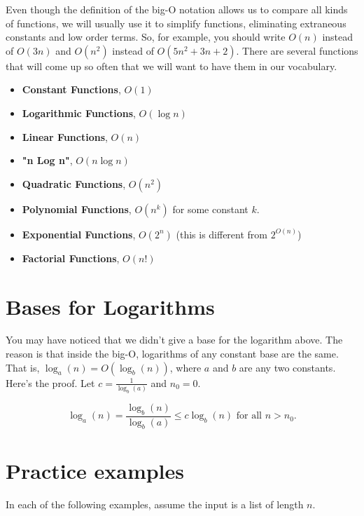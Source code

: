 Even though the definition of the big-O notation allows us to compare all kinds of functions, we will usually use it to simplify functions, eliminating extraneous constants and low order terms.
So, for example, you should write $O(n)$ instead of $O(3n)$ and $O(n^2)$ instead of $O(5n^2 + 3n + 2)$.
There are several functions that will come up so often that we will want to have them in our vocabulary.

\begin{itemize}

\item \textbf{Constant Functions}, $O(1)$

\item \textbf{Logarithmic Functions}, $O(\log n)$

\item \textbf{Linear Functions}, $O(n)$

\item \textbf{"n Log n"}, $O(n\log n)$

\item \textbf{Quadratic Functions}, $O(n^2)$

\item \textbf{Polynomial Functions}, $O(n^k)$ for some constant $k$.

\item \textbf{Exponential Functions}, $O(2^n)$ (this is different from $2^{O(n)}$)

\item \textbf{Factorial Functions}, $O(n!)$

\end{itemize}
\section{Bases for Logarithms}


You may have noticed that we didn't give a base for the logarithm above.
The reason is that inside the big-O, logarithms of any constant base are the same.
That is, $\log_a(n) = O(\log_b(n))$, where $a$ and $b$ are any two constants.
Here's the proof.
Let $c = \frac{1}{\log_b(a)}$ and $n_0 = 0$.  


\[
\log_a(n) = \frac{\log_b(n)}{\log_b(a)} \le c \log_b(n) \text{ for all }n>n_0.
\]

\section{Practice examples}


In each of the following examples, assume the input is a list of length $n$.

